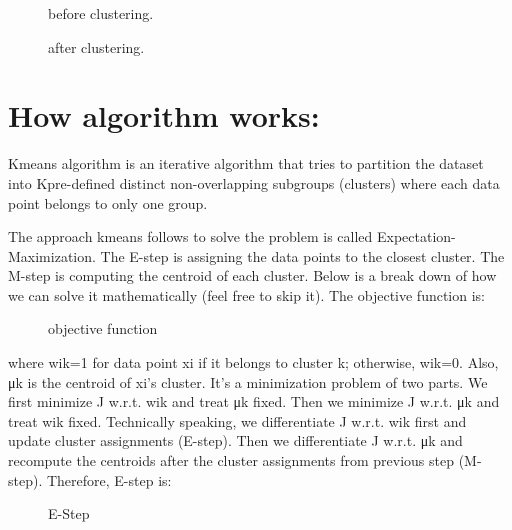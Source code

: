 \documentclass[12pt]{report}	%
\newcommand{\squeezeup}{\vspace{-0.6cm}}
\begin{document}
\begin{itemize}
    \begin{figure}[!h]
    	\captionsetup{font=scriptsize}
    	\begin{center}
    		\centerline{}
    		\caption{before clustering.}
    		\label{fig:1}
    	\end{center}
    	\squeezeup
    \end{figure}
    \begin{figure}[!h]
    	\captionsetup{font=scriptsize}
    	\begin{center}
    		\centerline{}
    		\caption{after clustering.}
    		\label{fig:1}
    	\end{center}
    	\squeezeup
    \end{figure}
    

\end{itemize}

\section{How algorithm works:}
Kmeans algorithm is an iterative algorithm that tries to partition the dataset into Kpre-defined distinct non-overlapping subgroups (clusters) where each data point belongs to only one group.

The approach kmeans follows to solve the problem is called Expectation-Maximization. The E-step is assigning the data points to the closest cluster. The M-step is computing the centroid of each cluster. Below is a break down of how we can solve it mathematically (feel free to skip it).
The objective function is:
\begin{figure}[!h]
	\captionsetup{font=scriptsize}
	\begin{center}
		\centerline{}
		\caption{objective function}
		\label{fig:1}
	\end{center}
	\squeezeup
\end{figure}

where wik=1 for data point xi if it belongs to cluster k; otherwise, wik=0. Also, μk is the centroid of xi’s cluster.
It’s a minimization problem of two parts. We first minimize J w.r.t. wik and treat μk fixed. Then we minimize J w.r.t. μk and treat wik fixed. Technically speaking, we differentiate J w.r.t. wik first and update cluster assignments (E-step). Then we differentiate J w.r.t. μk and recompute the centroids after the cluster assignments from previous step (M-step). Therefore, E-step is:
\begin{figure}[!h]
	\captionsetup{font=scriptsize}
	\begin{center}
		\centerline{}
		\caption{E-Step}
		\label{fig:1}
	\end{center}
	\squeezeup
\end{figure}
\end{document}
